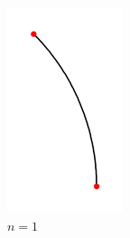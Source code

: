 \documentclass{gshs_thesis}
\theoremstyle{theorem}
\theoremstyle{lemma}
\theoremstyle{definition}
\begin{document}
\begin{figure}[h] \label{8}
	\begin{center}
		\begin{subfigure}{.2\textwidth}
			\includegraphics[width=\textwidth]{image/BCstep1}
			\caption{$n=1$}
		\end{subfigure}
		\begin{subfigure}{.2\textwidth}

\end{subfigure}
\end{center}
\end{figure}
\end{document}
